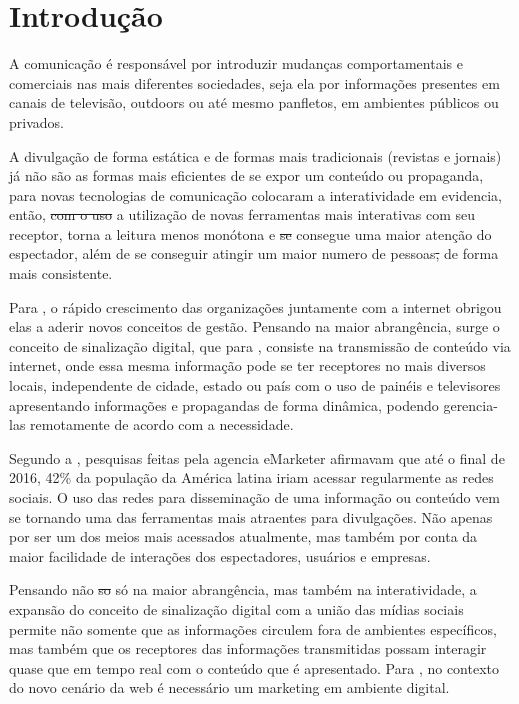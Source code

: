 \documentclass[
	12pt,				%
	openright,			%
	oneside,			%
	a4paper,			%
	english,			%
	french,				%
	spanish,			%
	brazil,				%
	]{abntex2}
\newcommand{\daniel}[2]{\sout{#1} {\color{red} #2}}
\begin{document}
\frenchspacing 
\imprimircapa
\imprimirfolhaderosto*



\section*{Introdução}
	A comunicação é responsável por introduzir mudanças comportamentais e comerciais nas mais diferentes sociedades, seja ela por informações presentes em canais de televisão, outdoors ou até mesmo panfletos, em ambientes públicos ou privados.
	
	A divulgação de forma estática e de formas mais tradicionais (revistas e jornais) já não são as formas mais eficientes de se expor um conteúdo ou propaganda, para \cite{escobar2007} novas tecnologias de comunicação colocaram a interatividade em evidencia, então,  \daniel{com o uso}{a utilização} de novas ferramentas mais interativas com seu receptor, torna a leitura menos monótona e \daniel{se}{} consegue uma maior atenção do espectador, além de se conseguir atingir um maior numero de pessoas\daniel{,}{} de forma mais consistente.
	
	Para \cite{machado2010}, o rápido crescimento das organizações juntamente com a internet obrigou elas a aderir novos conceitos de gestão. Pensando na maior abrangência, surge o conceito de sinalização digital, que para \cite{machado2010}, consiste na transmissão de conteúdo via internet,  onde essa mesma informação pode se ter receptores no mais diversos locais, independente de cidade, estado ou país com o uso de painéis e televisores apresentando informações e propagandas de forma dinâmica, podendo gerencia-las remotamente de acordo com a necessidade.
	
	Segundo a \cite{forbes2016}, pesquisas feitas pela agencia eMarketer afirmavam que até o final de 2016, 42\% da população da América latina iriam acessar regularmente as redes sociais. O uso das redes para disseminação de uma informação ou conteúdo vem se tornando uma das ferramentas mais atraentes para divulgações. Não apenas por ser um dos meios mais acessados atualmente, mas também por conta da maior facilidade de interações dos espectadores, usuários e empresas.
	
	Pensando não \daniel{so}{só} na maior abrangência, mas também na interatividade, a expansão do conceito de sinalização digital com a união das mídias sociais permite não somente que as informações circulem fora de ambientes específicos, mas também que os receptores das informações transmitidas possam interagir quase que em tempo real com o conteúdo que é apresentado. Para \cite{santos2014}, no contexto do novo cenário da web é necessário um marketing em ambiente digital. 
	
\end{document}
